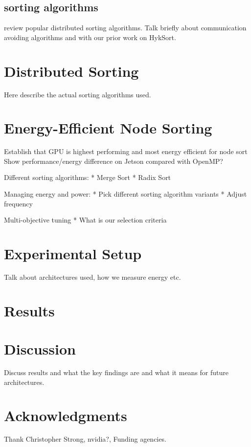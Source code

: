 \documentclass{sig-alternate}
\begin{document}
\subsection{sorting algorithms}
review popular distributed sorting algorithms. Talk briefly about communication avoiding algorithms and with our prior work on HykSort.

\section{Distributed Sorting}

Here describe the actual sorting algorithms used.

\section{Energy-Efficient Node Sorting}
Establish that GPU is highest performing and most energy efficient for node sort
Show performance/energy difference on Jetson compared with OpenMP?  

Different sorting algorithms:
* Merge Sort
* Radix Sort

Managing energy and power: 
* Pick different sorting algorithm variants
* Adjust frequency

Multi-objective tuning
* What is our selection criteria

\section{Experimental Setup}

Talk about architectures used, how we measure energy etc.

\section{Results}


\section{Discussion}
Discuss results and what the key findings are and what it means for future architectures.


\section{Acknowledgments}
Thank Christopher Strong, nvidia?, Funding agencies.


%

 

\end{document}

